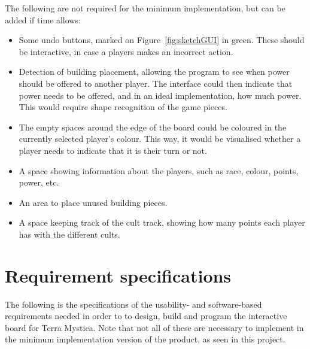 The following are not required for the minimum implementation, but can be added if time allows:
\begin{itemize}
\item Some undo buttons, marked on Figure~\ref{fig:sketchGUI} in green. These should be interactive, in case a players makes an incorrect action.
\item Detection of building placement, allowing the program to see when power should be offered to another player. The interface could then indicate that power needs to be offered, and in an ideal implementation, how much power. This would require shape recognition of the game pieces.
\item The empty spaces around the edge of the board could be coloured in the currently selected player's colour. This way, it would be visualised whether a player needs to indicate that it is their turn or not.
\item A space showing information about the players, such as race, colour, points, power, etc.
\item An area to place unused building pieces.
\item A space keeping track of the cult track, showing how many points each player has with the different cults.
\end{itemize}

\section{Requirement specifications}\label{sec:ReqSpec}
The following is the specifications of the usability- and software-based requirements needed in order to to design, build and program the interactive board for Terra Mystica. Note that not all of these are necessary to implement in the minimum implementation version of the product, as seen in this project. 


